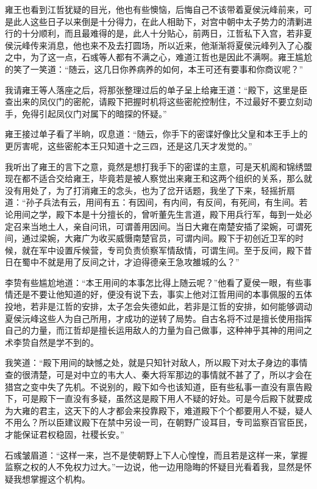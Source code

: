 雍王也看到江哲犹疑的目光，他也有些懊恼，后悔自己不该带着夏侯沅峰前来，可是此人这些日子以来倒是十分得力，在此人相助下，对宫中朝中太子势力的清剿进行的十分顺利，而且最难得的是，此人十分贴心，前两日，江哲私下入宫，若非夏侯沅峰传来消息，他也来不及去打圆场，所以近来，他渐渐将夏侯沅峰列入了心腹之中，为了这一点，石彧等人都有不满之心，难道江哲也是因此不满啊。雍王尴尬的笑了一笑道：“随云，这几日你养病养的如何，本王可还有要事和你商议呢？”

我请雍王等人落座之后，将那张整理过后的单子呈上给雍王道：“殿下，这里是臣查出来的凤仪门的密舵，请殿下把握时机将这些密舵控制住，不过最好不要立刻动手，免得引起凤仪门对属下的暗探的怀疑。”

雍王接过单子看了半晌，叹息道：“随云，你手下的密谍好像比父皇和本王手上的更厉害呢，这些密舵本王只知道十之三四，还是这几天才发觉的。”

我听出了雍王的言下之意，竟然是想打我手下的密谍的主意，可是天机阁和锦绣盟现在都不适合交给雍王，毕竟若是被人察觉出来雍王和这两个组织的关系，那么就没有用处了，为了打消雍王的念头，也为了岔开话题，我坐了下来，轻摇折扇道：“孙子兵法有云，用间有五：有因间，有内间，有反间，有死间，有生间。若论用间之学，殿下本是十分擅长的，曾听董先生言道，殿下用兵行军，每到一处必定召来当地土人，亲自问讯，可谓善用因间。当日大雍在南楚安插了梁婉，可谓死间，通过梁婉，大雍广为收买威慑南楚官员，可谓内间。殿下于初创近卫军的时候，就在军中设置斥候营，专司负责侦察军情敌情，可谓生间。至于反间，殿下昔日在蜀中不就是用了反间之计，才迫得德亲王急攻雒城的么？”

李贽有些尴尬地道：“本王用间的本事怎比得上随云呢？”他看了夏侯一眼，有些事情还是不要让他知道的好，便没有说下去，事实上他对江哲用间的本事佩服的五体投地，若非是江哲的安排，太子怎会失德如此，若非是江哲的安排，如何能够调动夏侯沅峰这些人为自己所用，才成功的逆转了局势。自古名将不过是擅长使用指挥自己的力量，而江哲却是擅长运用敌人的力量为自己做事，这种神乎其神的用间之术李贽自然是学不到的。

我笑道：“殿下用间的缺憾之处，就是只知针对敌人，所以殿下对太子身边的事情查的很清楚，可是对中立的韦大人、秦大将军那边的事情就不甚了了，所以才会在猎宫之变中失了先机。不说别的，殿下如今也该知道，臣有些私事一直没有禀告殿下，可是殿下一直没有多疑，虽然这是殿下用人不疑的好处。可是今后殿下就要成为大雍的君主，这天下的人才都会来投靠殿下，难道殿下个个都要用人不疑，疑人不用么？所以臣建议殿下在禁中另设一司，在朝野广设耳目，专司监察百官臣民，才能保证君权稳固，社稷长安。”

石彧皱眉道：“这样一来，岂不是使朝野上下人心惶惶，而且若是这样一来，掌握监察之权的人不免权力过大。”一边说，他一边用隐晦的怀疑目光看着我，显然是怀疑我想掌握这个机构。

